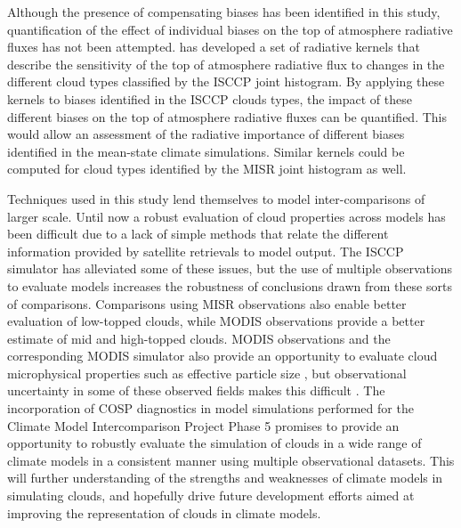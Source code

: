 Although the presence of compensating biases has been identified in this study, quantification of the effect of individual biases on the top of atmosphere radiative fluxes has not been attempted. \cite{zelinka_thesis} has developed a set of radiative kernels that describe the sensitivity of the top of atmosphere radiative flux to changes in the different cloud types classified by the ISCCP joint histogram. By applying these kernels to biases identified in the ISCCP clouds types, the impact of these different biases on the top of atmosphere radiative fluxes can be quantified. This would allow an assessment of the radiative importance of different biases identified in the mean-state climate simulations. Similar kernels could be computed for cloud types identified by the MISR joint histogram as well.

Techniques used in this study lend themselves to model inter-comparisons of larger scale. Until now a robust evaluation of cloud properties across models has been difficult due to a lack of simple methods that relate the different information provided by satellite retrievals to model output. The ISCCP simulator has alleviated some of these issues, but the use of multiple observations to evaluate models increases the robustness of conclusions drawn from these sorts of comparisons. Comparisons using MISR observations also enable better evaluation of low-topped clouds, while MODIS observations provide a better estimate of mid and high-topped clouds. MODIS observations and the corresponding MODIS simulator also provide an opportunity to evaluate cloud microphysical properties such as effective particle size \citep{pincus_et_al_2011}, but observational uncertainty in some of these observed fields makes this difficult \citep{kay_et_al_2011}. The incorporation of COSP diagnostics in model simulations performed for the Climate Model Intercomparison Project Phase 5 \citep[CMIP5;][]{taylor_et_al_2011} promises to provide an opportunity to robustly evaluate the simulation of clouds in a wide range of climate models in a consistent manner using multiple observational datasets. This will further understanding of the strengths and weaknesses of climate models in simulating clouds, and hopefully drive future development efforts aimed at improving the representation of clouds in climate models.
